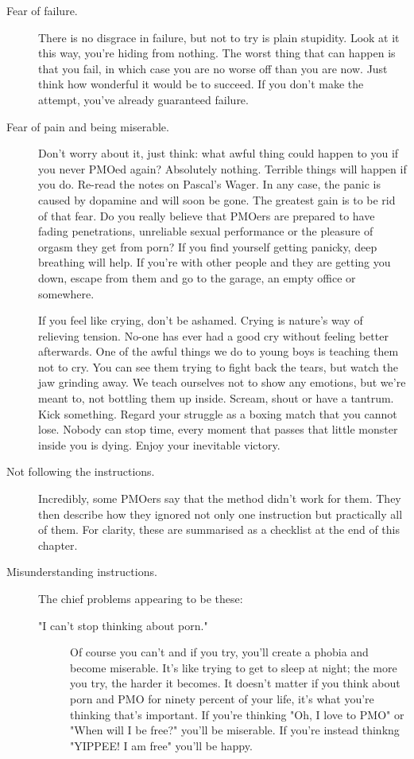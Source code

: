 \documentclass[easypeasy.tex]{subfiles}
\begin{document}
\begin{description}
  \item [Fear of failure.] There is no disgrace in failure, but not to try is plain stupidity. Look at it this way, you're hiding from nothing. The worst thing that can happen is that you fail, in which case you are no worse off than you are now. Just think how wonderful it would be to succeed. If you don't make the attempt, you've already guaranteed failure.

  \item [Fear of pain and being miserable.] Don't worry about it, just think: what awful thing could happen to you if you never PMOed again? Absolutely nothing. Terrible things will happen if you do. Re-read the notes on Pascal's Wager. In any case, the panic is caused by dopamine and will soon be gone. The greatest gain is to be rid of that fear. Do you really believe that PMOers are prepared to have fading penetrations, unreliable sexual performance or the pleasure of orgasm they get from porn? If you find yourself getting panicky, deep breathing will help. If you're with other people and they are getting you down, escape from them and go to the garage, an empty office or somewhere.

  If you feel like crying, don't be ashamed. Crying is nature's way of relieving tension. No-one has ever had a good cry without feeling better afterwards. One of the awful things we do to young boys is teaching them not to cry. You can see them trying to fight back the tears, but watch the jaw grinding away. We teach ourselves not to show any emotions, but we're meant to, not bottling them up inside. Scream, shout or have a tantrum. Kick something. Regard your struggle as a boxing match that you cannot lose. Nobody can stop time, every moment that passes that little monster inside you is dying. Enjoy your inevitable victory. 

  \item [Not following the instructions.] Incredibly, some PMOers say that the method didn't work for them. They then describe how they ignored not only one instruction but practically all of them. For clarity, these are summarised as a checklist at the end of this chapter.

  \item [Misunderstanding instructions.] The chief problems appearing to be these:

    \begin{description} 
    \item["I can't stop thinking about porn."]
      Of course you can't and if you try, you'll create a phobia and become miserable. It's like trying to get to sleep at night; the more you try, the harder it becomes. It doesn't matter if you think about porn and PMO for ninety percent of your life, it's what you're thinking that's important. If you're thinking "Oh, I love to PMO" or "When will I be free?" you'll be miserable. If you're instead thinkng "YIPPEE! I am free" you'll be happy.


\end{description}
\end{description}
\end{document}
